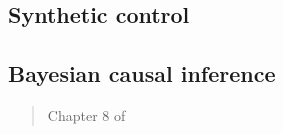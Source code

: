 \documentclass[12pt]{article}
\begin{document}
\begin{verse}  \end{verse}

\begin{verse}  \end{verse}

\begin{verse}  \end{verse}

\subsection{Synthetic control}

\begin{verse}  \end{verse}

\begin{verse}  \end{verse}

\begin{verse}  \end{verse}

\begin{verse}  \end{verse}

\begin{verse}  \end{verse}

\begin{verse}  \end{verse}

\subsection{Bayesian causal inference}

\begin{verse}  \end{verse}

\begin{verse} Chapter 8 of  \end{verse}

\begin{verse}  \end{verse}

\begin{verse}  \end{verse}

\begin{verse}  \end{verse}

\begin{verse}  \end{verse}

\begin{verse}  \end{verse}

\begin{verse}  \end{verse}

\clearpage

\printbibliography[title=References]
\end{document}
